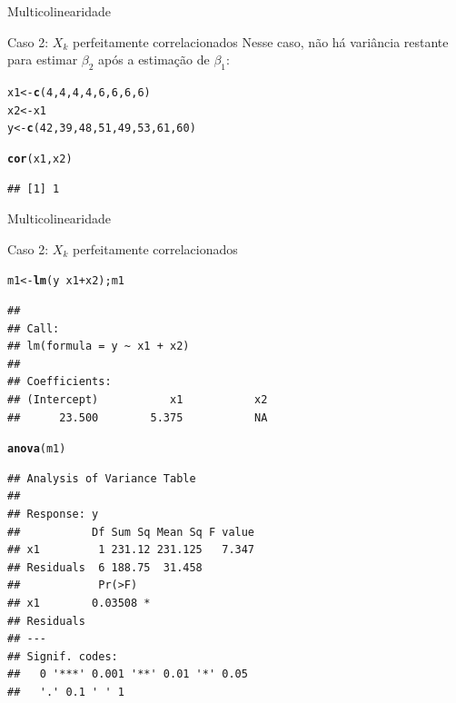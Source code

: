 \documentclass{beamer}\usepackage[]{graphicx}\usepackage[]{color}
\makeatletter
\newcommand{\hlnum}[1]{\textcolor[rgb]{0.686,0.059,0.569}{#1}}%
\newcommand{\hlopt}[1]{\textcolor[rgb]{0,0,0}{#1}}%
\newcommand{\hlstd}[1]{\textcolor[rgb]{0.345,0.345,0.345}{#1}}%
\newcommand{\hlkwb}[1]{\textcolor[rgb]{0.69,0.353,0.396}{#1}}%
\newcommand{\hlkwd}[1]{\textcolor[rgb]{0.737,0.353,0.396}{\textbf{#1}}}%
\newenvironment{kframe}{%
 \def\at@end@of@kframe{}%
 \ifinner\ifhmode%
  \def\at@end@of@kframe{\end{minipage}}%
  \begin{minipage}{\columnwidth}%
 \fi\fi%
 \def\FrameCommand##1{\hskip\@totalleftmargin \hskip-\fboxsep
 \colorbox{shadecolor}{##1}\hskip-\fboxsep
     \hskip-\linewidth \hskip-\@totalleftmargin \hskip\columnwidth}%
 \MakeFramed {\advance\hsize-\width
   \@totalleftmargin\z@ \linewidth\hsize
   \@setminipage}}%
 {\par\unskip\endMakeFramed%
 \at@end@of@kframe}
\newenvironment{knitrout}{}{} %
\renewenvironment{knitrout}{\setlength{\topsep}{0mm}}{}
\makeatother
\begin{document}
\begin{frame}[fragile]{Multicolinearidade}

Caso 2: $X_k$ perfeitamente correlacionados
\vfill
Nesse caso, não há variância restante para estimar $\beta _2$ após a estimação de $\beta _1$:
\vfill
\begin{knitrout}\tiny
{}\color{fgcolor}\begin{kframe}
\begin{alltt}
\hlstd{x1} \hlkwb{<-} \hlkwd{c}\hlstd{(}\hlnum{4}\hlstd{,}\hlnum{4}\hlstd{,}\hlnum{4}\hlstd{,}\hlnum{4}\hlstd{,}\hlnum{6}\hlstd{,}\hlnum{6}\hlstd{,}\hlnum{6}\hlstd{,}\hlnum{6}\hlstd{)}
\hlstd{x2} \hlkwb{<-} \hlstd{x1}
\hlstd{y} \hlkwb{<-} \hlkwd{c}\hlstd{(}\hlnum{42}\hlstd{,}\hlnum{39}\hlstd{,}\hlnum{48}\hlstd{,}\hlnum{51}\hlstd{,}\hlnum{49}\hlstd{,}\hlnum{53}\hlstd{,}\hlnum{61}\hlstd{,}\hlnum{60}\hlstd{)}

\hlkwd{cor}\hlstd{(x1,x2)}
\end{alltt}
\begin{verbatim}
## [1] 1
\end{verbatim}
\end{kframe}
\end{knitrout}

\end{frame}


\begin{frame}[fragile]{Multicolinearidade}

Caso 2: $X_k$ perfeitamente correlacionados
\vfill

\begin{knitrout}\tiny
{}\color{fgcolor}\begin{kframe}
\begin{alltt}
\hlstd{m1} \hlkwb{<-} \hlkwd{lm}\hlstd{(y} \hlopt{~} \hlstd{x1} \hlopt{+} \hlstd{x2); m1}
\end{alltt}
\begin{verbatim}
## 
## Call:
## lm(formula = y ~ x1 + x2)
## 
## Coefficients:
## (Intercept)           x1           x2  
##      23.500        5.375           NA
\end{verbatim}
\begin{alltt}
\hlkwd{anova}\hlstd{(m1)}
\end{alltt}
\begin{verbatim}
## Analysis of Variance Table
## 
## Response: y
##           Df Sum Sq Mean Sq F value
## x1         1 231.12 231.125   7.347
## Residuals  6 188.75  31.458        
##            Pr(>F)  
## x1        0.03508 *
## Residuals          
## ---
## Signif. codes:  
##   0 '***' 0.001 '**' 0.01 '*' 0.05
##   '.' 0.1 ' ' 1
\end{verbatim}
\end{kframe}
\end{knitrout}

\end{frame}
\end{document}
